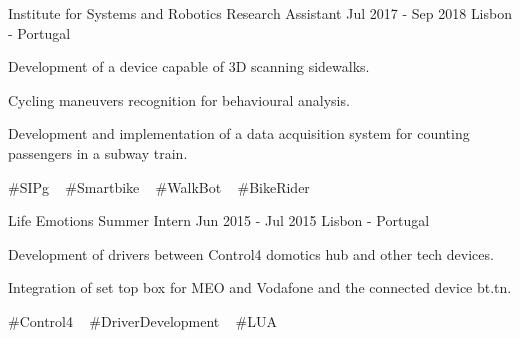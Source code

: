 

\begin{cventries}

  \cventry
    {Institute for Systems and Robotics} %
    {Research Assistant} %
    {Jul 2017 - Sep 2018} %
    {Lisbon - Portugal} %
    {
      \begin{cvitems} %
        \item {Development of a device capable of 3D scanning sidewalks.}
        \item {Cycling maneuvers recognition for behavioural analysis.}
        \item {Development and implementation of a data acquisition system for counting passengers in a subway train.}
      \end{cvitems}
    }
    {
      \#SIPg ~
      \#Smartbike ~
      \#WalkBot ~
      \#BikeRider ~
    }


  \cventry
    {Life Emotions} %
    {Summer Intern} %
    {Jun 2015 - Jul 2015} %
    {Lisbon - Portugal} %
    {
      \begin{cvitems} %
        \item {Development of drivers between Control4 domotics hub and other tech devices.}
        \item {Integration of set top box for MEO and Vodafone and the connected device bt.tn.}
      \end{cvitems}
    }
    {
      \#Control4 ~
      \#DriverDevelopment ~
      \#LUA ~
    }


\end{cventries}
